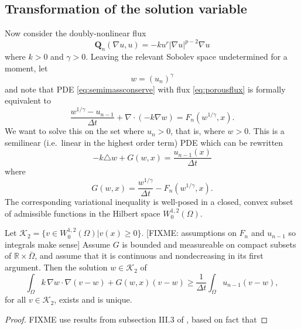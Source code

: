 \documentclass[final,leqno,onefignum,onetabnum]{siamltex1213bueler}
\newcommand\bQ{\mathbf{Q}}
\newcommand{\Div}{\nabla\cdot}
\renewcommand{\grad}{\nabla}
\newcommand\lap{\triangle}
\newcommand\RR{\mathbb{R}}
\begin{document}
\subsection{Transformation of the solution variable} \label{subsec:powertransform}  Now consider the doubly-nonlinear flux
\begin{equation}
  \bQ_n(\grad u,u) = - k u^r |\grad u|^{p-2} \grad u \label{eq:porousflux}
\end{equation}
where $k>0$ and $\gamma > 0$.  \cite{AlonsoSantillanaDawson,BLKCB,CDDSV}  Leaving the relevant Sobolev space undetermined for a moment, let
	$$w = (u_n)^\gamma$$
and note that PDE \eqref{eq:semimassconserve} with flux \eqref{eq:porousflux} is formally equivalent to
    $$\frac{w^{1/\gamma} - u_{n-1}}{\Delta t} + \Div \left(- k \grad w\right) = F_n(w^{1/\gamma},x).$$
We want to solve this on the set where $u_n>0$, that is, where $w>0$.  This is a semilinear (i.e.~linear in the highest order term) PDE which can be rewritten
\begin{equation}
    - k \lap w + G(w,x) = \frac{u_{n-1}(x)}{\Delta t} \label{eq:transformedporouseqn}
\end{equation}
where
\begin{equation}
    G(w,x) = \frac{w^{1/\gamma}}{\Delta t} - F_n(w^{1/\gamma},x). \label{eq:transformedporousG}
\end{equation}
The corresponding variational inequality is well-posed in a closed, convex subset of admissible functions in the Hilbert space $W_0^{1,2}(\Omega)$.

\medskip
\begin{theorem}  \label{thm:porouswellposed}  Let $\mathcal{K}_2 = \{v \in W_0^{1,2}(\Omega)\big| v(x) \ge 0\}$.  [FIXME: assumptions on $F_n$ and $u_{n-1}$ so integrals make sense]  Assume $G$ is bounded and measureable on compact subsets of $\RR\times \bar\Omega$, and assume that it is continuous and nondecreasing in its first argument.  Then the solution $w\in \mathcal{K}_2$ of
\begin{equation}
  \int_\Omega k\, \grad w \cdot \grad (v-w) + G(w,x) (v-w)  \ge  \frac{1}{\Delta t} \int_\Omega u_{n-1} (v-w), \label{eq:porousVIforw}
\end{equation}
for all $v\in\mathcal{K}_2$, exists and is unique.
\end{theorem}

\begin{proof}
FIXME use results from subsection III.3 of \cite{KinderlehrerStampacchia}, based on fact that
\end{proof}
\end{document}
